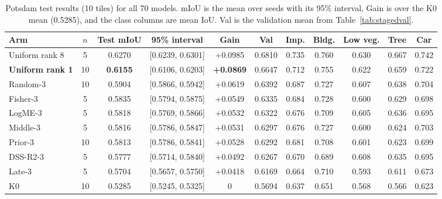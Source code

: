 \documentclass[11pt,a4paper]{report}
\begin{document}
\begin{table}[t]
\centering
\caption{Potsdam test results (10 tiles) for all 70 models. mIoU is the mean over seeds with its 95\% interval, Gain is over the K0 mean (0.5285), and the class columns are mean IoU. Val is the validation mean from Table~\ref{tab:stagedval}.}
\label{tab:test}
\small
\setlength{\tabcolsep}{3pt}
\begin{tabular}{@{}lcccccccccc@{}}
\toprule
\textbf{Arm} & \textbf{$n$} & \textbf{Test mIoU} & \textbf{95\% interval} & \textbf{Gain} & \textbf{Val} & \textbf{Imp.} & \textbf{Bldg.} & \textbf{Low veg.} & \textbf{Tree} & \textbf{Car} \\
\midrule
Uniform rank 8 & 5 & 0.6270 & [0.6239, 0.6301] & +0.0985 & 0.6810 & 0.735 & 0.760 & 0.630 & 0.667 & 0.742 \\
\textbf{Uniform rank 1} & 10 & \textbf{0.6155} & [0.6106, 0.6203] & \textbf{+0.0869} & 0.6647 & 0.712 & 0.755 & 0.622 & 0.659 & 0.722 \\
Random-3 & 10 & 0.5904 & [0.5866, 0.5942] & +0.0619 & 0.6392 & 0.687 & 0.727 & 0.607 & 0.638 & 0.704 \\
Fisher-3 & 5 & 0.5835 & [0.5794, 0.5875] & +0.0549 & 0.6335 & 0.684 & 0.728 & 0.600 & 0.629 & 0.698 \\
LogME-3 & 5 & 0.5818 & [0.5769, 0.5866] & +0.0532 & 0.6322 & 0.676 & 0.709 & 0.605 & 0.636 & 0.695 \\
Middle-3 & 5 & 0.5816 & [0.5786, 0.5847] & +0.0531 & 0.6297 & 0.676 & 0.727 & 0.600 & 0.624 & 0.703 \\
Prior-3 & 10 & 0.5813 & [0.5786, 0.5841] & +0.0528 & 0.6292 & 0.681 & 0.708 & 0.601 & 0.623 & 0.699 \\
DSS-R2-3 & 5 & 0.5777 & [0.5714, 0.5840] & +0.0492 & 0.6267 & 0.670 & 0.689 & 0.608 & 0.635 & 0.695 \\
Late-3 & 5 & 0.5704 & [0.5657, 0.5750] & +0.0418 & 0.6169 & 0.664 & 0.710 & 0.593 & 0.611 & 0.673 \\
K0 & 10 & 0.5285 & [0.5245, 0.5325] & 0 & 0.5694 & 0.637 & 0.651 & 0.568 & 0.566 & 0.623 \\
\bottomrule
\end{tabular}
\end{table}
\end{document}
